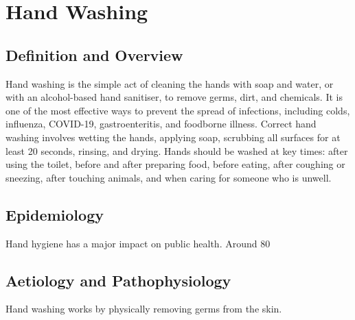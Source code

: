 \chapter{Hand Washing}

\section*{Definition and Overview}
Hand washing is the simple act of cleaning the hands with soap and water, or with an alcohol-based hand sanitiser, to remove germs, dirt, and chemicals. It is one of the most effective ways to prevent the spread of infections, including colds, influenza, COVID-19, gastroenteritis, and foodborne illness. Correct hand washing involves wetting the hands, applying soap, scrubbing all surfaces for at least 20 seconds, rinsing, and drying. Hands should be washed at key times: after using the toilet, before and after preparing food, before eating, after coughing or sneezing, after touching animals, and when caring for someone who is unwell.

\section*{Epidemiology}
Hand hygiene has a major impact on public health. Around 80%

\section*{Aetiology and Pathophysiology}
Hand washing works by physically removing germs from the skin.


